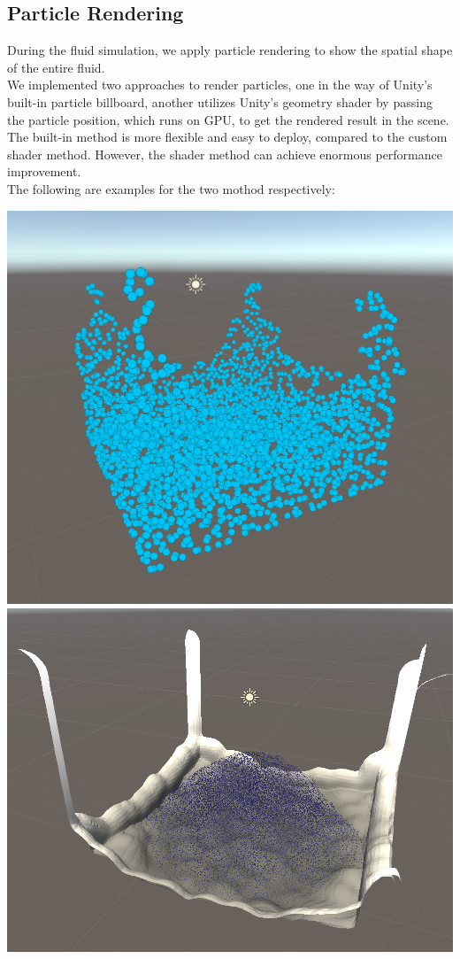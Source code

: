 \documentclass[acmtog]{acmart}
\begin{document}
\subsection{Particle Rendering}
During the fluid simulation, we apply particle rendering to show the spatial shape of the entire fluid.\\
We implemented two approaches to render particles, one in the way of Unity's built-in particle billboard, another utilizes Unity's geometry shader by passing the particle position, which runs on GPU, to get the rendered result in the scene.\\
The built-in method is more flexible and easy to deploy, compared to the custom shader method. However, the shader method can achieve enormous performance improvement.\\
The following are examples for the two mothod respectively:
\begin{center}
    \includegraphics[width=0.9\linewidth]{../Images/Particles_Unity.PNG}
    \includegraphics[width=0.9\linewidth]{../Images/Particles_GPU.PNG}
\end{center}
\end{document}
